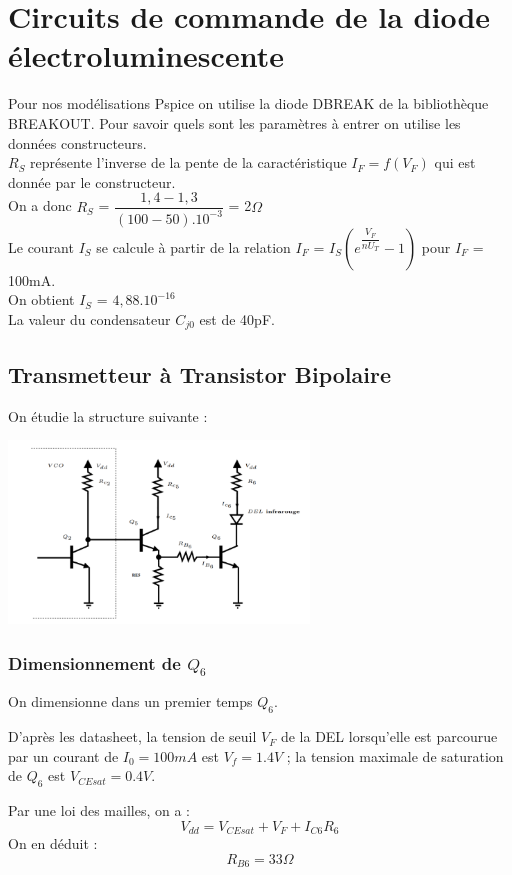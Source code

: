 \documentclass[a4paper]{report}
\begin{document}
\section{Circuits de commande de la diode électroluminescente}
Pour nos modélisations Pspice on utilise la diode DBREAK de la bibliothèque BREAKOUT. Pour savoir quels sont les paramètres à entrer on utilise les données constructeurs.\\
$R_S$ représente l'inverse de la pente de la caractéristique $I_F=f(V_F)$ qui est donnée par le constructeur.\\ On a donc $R_S$ = $\dfrac{1,4 - 1,3}{(100-50).10^{-3}}$ = 2$\Omega$\\
Le courant $I_S$ se calcule à partir de la relation $I_F$ = $I_S(e^{\dfrac{V_F}{nU_T}}-1)$ pour $I_F$ = 100mA.\\ On obtient $I_S$ = $4,88.10^{-16}$\\
La valeur du condensateur $C_{j0}$ est de 40pF.

\subsection{Transmetteur à Transistor Bipolaire}
On étudie la structure suivante : 

\begin{center}
\includegraphics[width=0.6\textwidth]{montage_diode.PNG}
\end{center}

\subsubsection{Dimensionnement de $Q_6$}

On dimensionne dans un premier temps $Q_6$.

D'après les datasheet, la tension de seuil $V_F$ de la DEL lorsqu'elle est parcourue par un courant de $I_0 = 100mA$ est  $V_f = 1.4 V$ ; la tension maximale de saturation de $Q_6$ est $V_{CEsat} = 0.4 V$.

Par une loi des mailles, on a : 
$$ V_{dd} = V_{CEsat} + V_F + I_{C6}R_6$$
On en déduit : $$R_{B6} = 33\Omega$$
\end{document}
